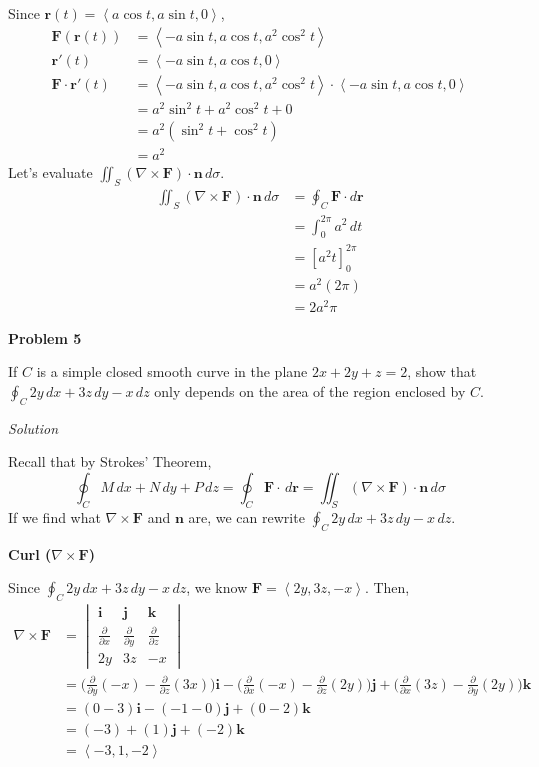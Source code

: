 \documentclass{article}
\newcommand{\lrp}[1]{\left( #1 \right)}
\newcommand{\lra}[1]{\left\langle #1 \right\rangle}
\newcommand{\lrb}[1]{\left[ #1 \right]}
\renewcommand{\i}[0]{\mathbf{i}}
\renewcommand{\j}[0]{\mathbf{j}}
\renewcommand{\k}[0]{\mathbf{k}}
\renewcommand{\r}[0]{\mathbf{r}}
\newcommand{\F}[0]{\mathbf{F}}
\newcommand{\n}[0]{\mathbf{n}}
\newcommand{\Solution}{\textit{Solution}}
\begin{document}
Since $\r(t)=\lra{a\cos t, a\sin t, 0}$,
\begin{align*}
    \F\lrp{\r(t)}&=\lra{-a\sin t, a\cos t, a^2\cos^2 t}\\
    \r'(t)&=\lra{-a\sin t, a\cos t,0}\\
    \F\cdot \r'(t)&=\lra{-a\sin t,a\cos t, a^2\cos^2 t}\cdot \lra{-a\sin t,a\cos t, 0}\\
    &=a^2\sin^2 t+a^2\cos^2 t + 0\\
    &=a^2\lrp{\sin^2 t + \cos^2 t}\\
    &=a^2\tag{$\sin^2 t +\cos^2 t = 1$}
\end{align*}
Let's evaluate $\displaystyle\iint_S \lrp{\nabla \times \F}\cdot \n\,d\sigma$.
\begin{align*}
    \iint_S \lrp{\nabla \times \F}\cdot \n\,d\sigma&=\oint_C \F\cdot d\r\\
    &=\int_0^{2\pi} a^2\,dt\\
    &=\lrb{a^2t}_0^{2\pi}\\
    &=a^2\lrp{2\pi}\\
    &=\boxed{2a^2\pi}
\end{align*}

{}\textbf{Problem 5}

If $C$ is a simple closed smooth curve in the plane $2x+2y+z=2$, show that $\displaystyle\oint_C 2y\,dx+3z\,dy-x\,dz$ only depends on the area of the region enclosed by $C$.


\Solution

Recall that by Strokes' Theorem,
\begin{equation*}
    \oint_C M\,dx+N\,dy+P\,dz=\oint_C \F\cdot\,d\r= \iint_S \lrp{\nabla \times \F}\cdot \n\,d\sigma
\end{equation*}
If we find what $\nabla \times \F$ and $\n$ are, we can rewrite $\displaystyle\oint_C 2y\,dx+3z\,dy-x\,dz$.

{} \textbf{Curl ($\displaystyle\nabla \times \F$)}

Since $\displaystyle\oint_C 2y\,dx+3z\,dy-x\,dz$, we know $\displaystyle \F =\lra{2y,3z,-x}$. Then,
\begin{align*}
    \nabla \times \F &= \begin{vmatrix}
    \i & \j & \k \\
    \frac{\partial }{\partial x} &  \frac{\partial }{\partial y} &
     \frac{\partial }{\partial z}\\
    2y& 3z & -x
    \end{vmatrix}\\
    &=\Bigg(\frac{\partial }{\partial y}(-x)-\frac{\partial }{\partial z}(3x)\Bigg)\i-\Bigg(\frac{\partial}{\partial x}(-x)-\frac{\partial}{\partial z}(2y)\Bigg)\j+\Bigg(\frac{\partial}{\partial x}(3z)-\frac{\partial}{\partial y}({2y})\Bigg)\k\\
    &=\lrp{0-3}\i - \lrp{-1-0}\j+\lrp{0-2}\k\\
    &=\lrp{-3}+\lrp{1}\j +\lrp{-2}\k\\
    &=\lra{-3,1,-2}
\end{align*}
\end{document}
